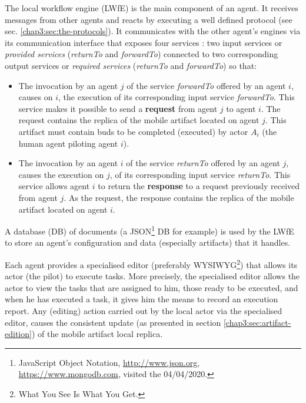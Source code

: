 The local workflow engine (LWfE) is the main component of an agent. 
It receives messages from other agents and reacts by executing a well defined protocol (see sec. \ref{chap3:sec:the-protocols}). It communicates with the other agent's engines via its communication interface that exposes four services : two input services or \textit{provided services} (\textit{returnTo} and \textit{forwardTo}) connected to two corresponding output services or \textit{required services} (\textit{returnTo} and \textit{forwardTo}) so that: 

\begin{itemize}
	\item The invocation by an agent $j$ of the service \textit{forwardTo} offered by an agent $i$, causes on $i$, the execution of its corresponding input service \textit{forwardTo}. This service makes it possible to send a \textbf{request} from agent $j$ to agent $i$. The request contains the replica of the mobile artifact located on agent $j$. This artifact must contain buds to be completed (executed) by actor $A_i$ (the human agent piloting agent $i$). 
	\item The invocation by an agent $i$ of the service \textit{returnTo} offered by an agent $j$, causes the execution on $j$, of its corresponding input service \textit{returnTo}. This service allows agent $i$ to return the \textbf{response} to a request previously received from agent $j$. As the request, the response contains the replica of the mobile artifact located on agent $i$.
\end{itemize}


\label{chap3:sec:the-storage-device}

A database (DB) of documents (a JSON\footnote{JavaScript Object Notation, \url{http://www.json.org}, \url{https://www.mongodb.com}, visited the 04/04/2020.} DB for example) is used by the LWfE to store an agent's configuration and data (especially artifacts) that it handles. 	
	
\label{chap3:sec:the-specialised-editor}
	
Each agent provides a specialised editor (preferably WYSIWYG\footnote{What You See Is What You Get.}) that allows its actor (the pilot) to execute tasks. More precisely, the specialised editor allows the actor to view the tasks that are assigned to him, those ready to be executed, and when he has executed a task, it gives him the means to record an execution report. Any (editing) action carried out by the local actor via the specialised editor, causes the consistent update (as presented in section \ref{chap3:sec:artifact-edition}) of the mobile artifact local replica.

